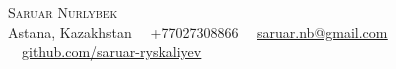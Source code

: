 \documentclass[letterpaper,11pt]{article}
\begin{document}


\begin{center}
    {\Huge \scshape Saruar Nurlybek} \\
    \vspace{5pt}
    \small Astana, Kazakhstan \ \textbar\ +77027308866 \ \textbar\ \href{mailto:saruar.nb@gmail.com}{\underline{saruar.nb@gmail.com}} \ \textbar\ \href{https://github.com/saruar-ryskaliyev/}{\underline{github.com/saruar-ryskaliyev}}
    \vspace{-8pt}
\end{center}



\end{document}
